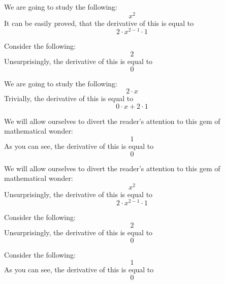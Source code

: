 \documentclass{article}
\begin{document}
We are going to study the following:
\begin{equation}
x ^{2 } 
\end{equation}
It can be easily proved, that the derivative of this is equal to
\begin{equation}
2 \cdot x ^{2 - 1 } \cdot 1 
\end{equation}

Consider the following:
\begin{equation}
2 
\end{equation}
Unsurprisingly, the derivative of this is equal to
\begin{equation}
0 
\end{equation}

We are going to study the following:
\begin{equation}
2 \cdot x 
\end{equation}
Trivially, the derivative of this is equal to
\begin{equation}
0 \cdot x + 2 \cdot 1 
\end{equation}

We will allow ourselves to divert the reader's attention to this gem of mathematical wonder:
\begin{equation}
1 
\end{equation}
As you can see, the derivative of this is equal to
\begin{equation}
0 
\end{equation}

We will allow ourselves to divert the reader's attention to this gem of mathematical wonder:
\begin{equation}
x ^{2 } 
\end{equation}
Unsurprisingly, the derivative of this is equal to
\begin{equation}
2 \cdot x ^{2 - 1 } \cdot 1 
\end{equation}

Consider the following:
\begin{equation}
2 
\end{equation}
Unsurprisingly, the derivative of this is equal to
\begin{equation}
0 
\end{equation}

Consider the following:
\begin{equation}
1 
\end{equation}
As you can see, the derivative of this is equal to
\begin{equation}
0 
\end{equation}
\end{document}

